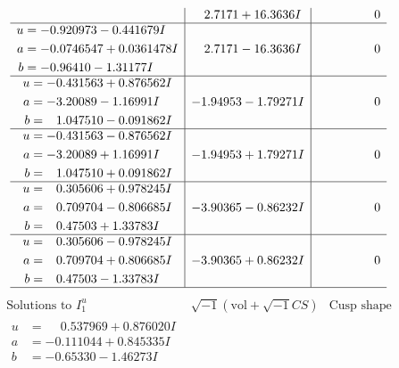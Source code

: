\documentclass[1p]{elsarticle_modified}
\theoremstyle{definition}
\newcommand{\I}{\sqrt{-1}}
\begin{document}
$$\begin{array}{c|c|c}
 & \phantom{-}2.7171 + 16.3636 I & \phantom{-0.000000 } 0 \\ \hline\begin{aligned}
u &= -0.920973 - 0.441679 I \\
a &= -0.0746547 + 0.0361478 I \\
b &= -0.96410 - 1.31177 I\end{aligned}
 & \phantom{-}2.7171 - 16.3636 I & \phantom{-0.000000 } 0 \\ \hline\begin{aligned}
u &= -0.431563 + 0.876562 I \\
a &= -3.20089 - 1.16991 I \\
b &= \phantom{-}1.047510 - 0.091862 I\end{aligned}
 & -1.94953 - 1.79271 I & \phantom{-0.000000 } 0 \\ \hline\begin{aligned}
u &= -0.431563 - 0.876562 I \\
a &= -3.20089 + 1.16991 I \\
b &= \phantom{-}1.047510 + 0.091862 I\end{aligned}
 & -1.94953 + 1.79271 I & \phantom{-0.000000 } 0 \\ \hline\begin{aligned}
u &= \phantom{-}0.305606 + 0.978245 I \\
a &= \phantom{-}0.709704 - 0.806685 I \\
b &= \phantom{-}0.47503 + 1.33783 I\end{aligned}
 & -3.90365 - 0.86232 I & \phantom{-0.000000 } 0 \\ \hline\begin{aligned}
u &= \phantom{-}0.305606 - 0.978245 I \\
a &= \phantom{-}0.709704 + 0.806685 I \\
b &= \phantom{-}0.47503 - 1.33783 I\end{aligned}
 & -3.90365 + 0.86232 I & \phantom{-0.000000 } 0\\
 \hline 
 \end{array}$$\newpage$$\begin{array}{c|c|c}  
\text{Solutions to }I^u_{1}& \I (\text{vol} + \sqrt{-1}CS) & \text{Cusp shape}\\
 \hline 
\begin{aligned}
u &= \phantom{-}0.537969 + 0.876020 I \\
a &= -0.111044 + 0.845335 I \\
b &= -0.65330 - 1.46273 I\end{aligned}

\end{array}$$
\end{document}
